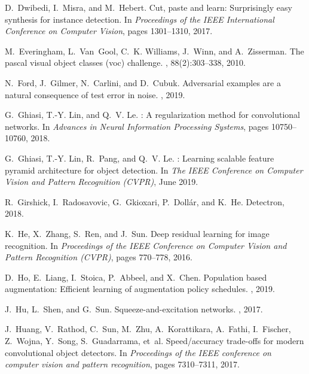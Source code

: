 \documentclass[10pt,twocolumn,letterpaper]{article}
\begin{document}
\begin{thebibliography}{10}
D.~Dwibedi, I.~Misra, and M.~Hebert.
\newblock Cut, paste and learn: Surprisingly easy synthesis for instance
  detection.
\newblock In {\em Proceedings of the IEEE International Conference on Computer
  Vision}, pages 1301--1310, 2017.

M.~Everingham, L.~Van~Gool, C.~K. Williams, J.~Winn, and A.~Zisserman.
\newblock The pascal visual object classes (voc) challenge.
, 88(2):303--338, 2010.

N.~Ford, J.~Gilmer, N.~Carlini, and D.~Cubuk.
\newblock Adversarial examples are a natural consequence of test error in
  noise.
, 2019.

G.~Ghiasi, T.-Y. Lin, and Q.~V. Le.
: A regularization method for convolutional networks.
\newblock In {\em Advances in Neural Information Processing Systems}, pages
  10750--10760, 2018.

G.~Ghiasi, T.-Y. Lin, R.~Pang, and Q.~V. Le.
: Learning scalable feature pyramid architecture for object
  detection.
\newblock In {\em The IEEE Conference on Computer Vision and Pattern
  Recognition (CVPR)}, June 2019.

R.~Girshick, I.~Radosavovic, G.~Gkioxari, P.~Doll{\'a}r, and K.~He.
\newblock Detectron, 2018.

K.~He, X.~Zhang, S.~Ren, and J.~Sun.
\newblock Deep residual learning for image recognition.
\newblock In {\em Proceedings of the IEEE Conference on Computer Vision and
  Pattern Recognition (CVPR)}, pages 770--778, 2016.

D.~Ho, E.~Liang, I.~Stoica, P.~Abbeel, and X.~Chen.
\newblock Population based augmentation: Efficient learning of augmentation
  policy schedules.
, 2019.

J.~Hu, L.~Shen, and G.~Sun.
\newblock Squeeze-and-excitation networks.
, 2017.

J.~Huang, V.~Rathod, C.~Sun, M.~Zhu, A.~Korattikara, A.~Fathi, I.~Fischer,
  Z.~Wojna, Y.~Song, S.~Guadarrama, et~al.
\newblock Speed/accuracy trade-offs for modern convolutional object detectors.
\newblock In {\em Proceedings of the IEEE conference on computer vision and
  pattern recognition}, pages 7310--7311, 2017.


\end{thebibliography}
\end{document}
